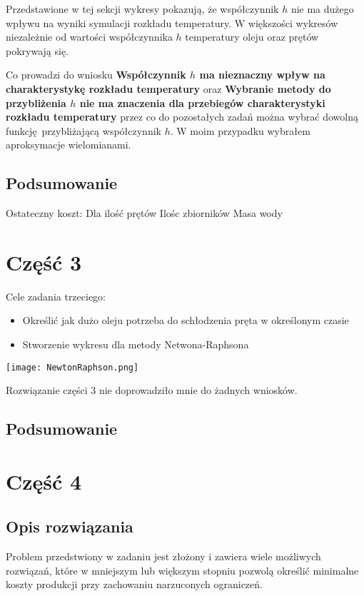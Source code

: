 \documentclass[varwidth,12pt,a4paper]{article}
\begin{document}
Przedstawione w tej sekcji wykresy pokazują, że współczynnik $h$ nie ma dużego wpływu na 
wyniki symulacji rozkładu temperatury. W większości wykresów niezależnie od wartości współczynnika $h$
temperatury oleju oraz prętów pokrywają się.

Co prowadzi do wniosku \textbf{Współczynnik $h$ ma nieznaczny wpływ na charakterystykę rozkładu temperatury}
oraz \textbf{Wybranie metody do przybliżenia $h$ nie ma znaczenia dla przebiegów charakterystyki rozkładu temperatury}
przez co do pozostałych zadań można wybrać dowolną funkcję przybliżającą współczynnik $h$.
W moim przypadku wybrałem aproksymacje wielomianami.

\subsection{Podsumowanie}

Ostateczny koszt: 
Dla ilość prętów
Ilośc zbiorników
Masa wody

\section{Część 3}

Cele zadania trzeciego:

\begin{itemize}
  \item Określić jak dużo oleju potrzeba do schłodzenia pręta w określonym czasie
  \item Stworzenie wykresu dla metody Netwona-Raphsona
\end{itemize}

\texttt{[image: NewtonRaphson.png]} 

Rozwiązanie części 3 nie doprowadziło mnie do żadnych wniosków.

\subsection{Podsumowanie}



\section{Część 4}

\subsection{Opis rozwiązania}

Problem przedstwiony w zadaniu jest złożony i zawiera wiele możliwych rozwiązań, które w mniejszym
lub większym stopniu pozwolą określić minimalne koszty produkcji przy zachowaniu narzuconych
ograniczeń.
\end{document}
